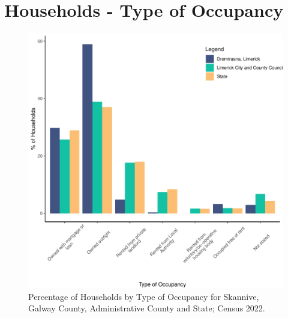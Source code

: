\documentclass{article}
\begin{document}
\section{Households - Type of Occupancy}\label{sect:Households}
\begin{figure}[H]
	\centering
	\includegraphics[width = 140mm]{../figures/HouseholdsED.pdf}
	\caption{Percentage of Households by Type of Occupancy for Skannive, Galway County, Administrative County and State; Census 2022.}
	\label{fig:vbnv}
	\end{figure}
\end{document}
